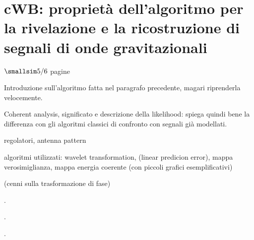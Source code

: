 \chapter[cWB]{cWB: proprietà dell'algoritmo per la rivelazione e la ricostruzione di segnali di onde gravitazionali}
\label{chapter:cwb}
\begin{center}
	$\smallsim 5/6$ pagine
\end{center}

Introduzione sull'algoritmo fatta nel paragrafo precedente, magari riprenderla velocemente.

Coherent analysis, significato e descrizione della likelihood: spiega quindi bene la differenza con gli algoritmi classici di confronto con segnali già modellati.

regolatori, antenna pattern

algoritmi utilizzati: wavelet transformation, (linear predicion error), mappa verosimiglianza, mappa energia coerente (con piccoli grafici esemplificativi)

(cenni sulla trasformazione di fase)


\lipsum[3]\cite{Abbott_2017a}.

\lipsum[4]\cite{Klimenko_2008}.

\lipsum[6]\cite{Klimenko_2016}.
